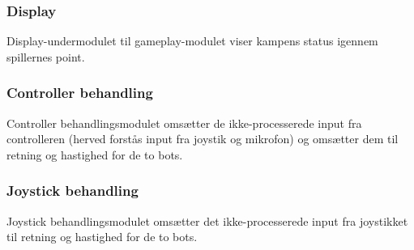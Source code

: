 \subsubsection*{\textbf{Display}}
Display-undermodulet til gameplay-modulet viser kampens status igennem spillernes point. 
\subsubsection*{\textbf{Controller behandling}}
Controller behandlingsmodulet omsætter de ikke-processerede input fra controlleren (herved forstås input fra joystik og mikrofon) og omsætter dem til retning og hastighed for de to bots.  
\subsubsection*{\textbf{Joystick behandling}}
Joystick behandlingsmodulet omsætter det ikke-processerede input fra joystikket til retning og hastighed for de to bots.

